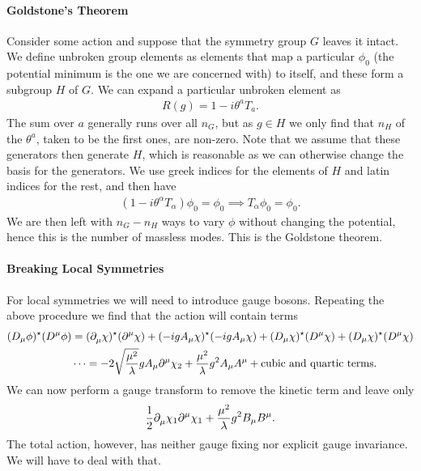 \paragraph{Goldstone's Theorem}
Consider some action and suppose that the symmetry group $G$ leaves it intact. We define unbroken group elements as elements that map a particular $\phi_{0}$ (the potential minimum is the one we are concerned with) to itself, and these form a subgroup $H$ of $G$. We can expand a particular unbroken element as
\begin{align*}
R(g) = 1 - i\theta^{a}T_{a}.
\end{align*}
The sum over $a$ generally runs over all $n_{G}$, but as $g\in H$ we only find that $n_{H}$ of the $\theta^{a}$, taken to be the first ones, are non-zero. Note that we assume that these generators then generate $H$, which is reasonable as we can otherwise change the basis for the generators. We use greek indices for the elements of $H$ and latin indices for the rest, and then have
\begin{align*}
(1 - i\theta^{\alpha}T_{\alpha})\phi_{0} = \phi_{0}\implies T_{\alpha}\phi_{0} = \phi_{0}.
\end{align*}
We are then left with $n_{G} - n_{H}$ ways to vary $\phi$ without changing the potential, hence this is the number of massless modes. This is the Goldstone theorem.

\paragraph{Breaking Local Symmetries}
For local symmetries we will need to introduce gauge bosons. Repeating the above procedure we find that the action will contain terms
\begin{align*}
(D_{\mu}\phi)^{\star}(D^{\mu}\phi) &= (\partial^{}_{\mu}\chi)^{\star}(\partial^{\mu}_{}\chi) + (-igA_{\mu}\chi)^{\star}(-igA_{\mu}\chi) + (D_{\mu}\chi)^{\star}(D^{\mu}\chi) + (D_{\mu}\chi)^{\star}(D^{\mu}\chi) \\
&\dots = -2\sqrt{\frac{\mu^{2}}{\lambda}}gA_{\mu}\partial^{\mu}_{}\chi_{2} + \frac{\mu^{2}}{\lambda}g^{2}A_{\mu}A^{\mu} + \text{cubic and quartic terms}.
\end{align*}
We can now perform a gauge transform to remove the kinetic term and leave only
\begin{align*}
\frac{1}{2}\partial^{}_{\mu}\chi_{1}\partial^{\mu}_{}\chi_{1} + \frac{\mu^{2}}{\lambda}g^{2}B_{\mu}B^{\mu}.
\end{align*}
The total action, however, has neither gauge fixing nor explicit gauge invariance. We will have to deal with that.

